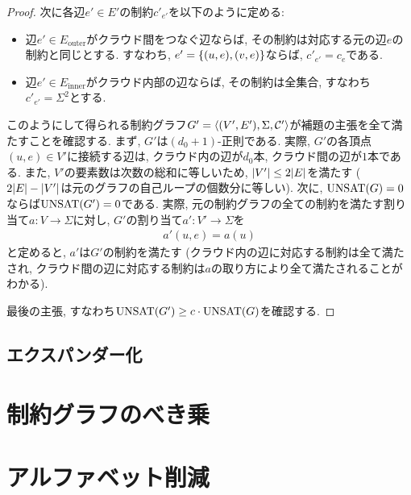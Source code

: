 \begin{proof}
次に各辺$e'\in E'$の制約$c'_{e'}$を以下のように定める:
\begin{itemize}
\item 辺$e'\in E_{\mathrm{outer}}$がクラウド間をつなぐ辺ならば, その制約は対応する元の辺$e$の制約と同じとする.
すなわち, $e'=\qty{ (u,e), (v,e) }$ならば, $c'_{e'}=c_e$である.
\item 辺$e'\in E_{\mathrm{inner}}$がクラウド内部の辺ならば, その制約は全集合, すなわち$c'_{e'}=\Sigma^2$とする.
\end{itemize}

このようにして得られる制約グラフ$G'=\langle(V',E'),\Sigma,\mathcal{C}'\rangle$が補題の主張を全て満たすことを確認する.
まず, $G'$は$(d_0+1)$-正則である.
実際, $G'$の各頂点$(u,e)\in V'$に接続する辺は, クラウド内の辺が$d_0$本, クラウド間の辺が$1$本である.
また, $V'$の要素数は次数の総和に等しいため, $\abs{V'}\le 2\abs{E}$を満たす ($2\abs{E}-\abs{V'}$は元のグラフの自己ループの個数分に等しい).
次に, $\mathrm{UNSAT}(G)=0$ならば$\mathrm{UNSAT}(G')=0$である.
実際, 元の制約グラフの全ての制約を満たす割り当て$a\colon V\to\Sigma$に対し, $G'$の割り当て$a'\colon V'\to\Sigma$を
\begin{align*}
  a'(u,e) = a(u)
\end{align*}
と定めると, $a'$は$G'$の制約を満たす (クラウド内の辺に対応する制約は全て満たされ, クラウド間の辺に対応する制約は$a$の取り方により全て満たされることがわかる).

最後の主張, すなわち$\mathrm{UNSAT}(G') \ge c\cdot \mathrm{UNSAT}(G)$を確認する.




\end{proof}

\subsection{エクスパンダー化}


\section{制約グラフのべき乗}

\section{アルファベット削減}



